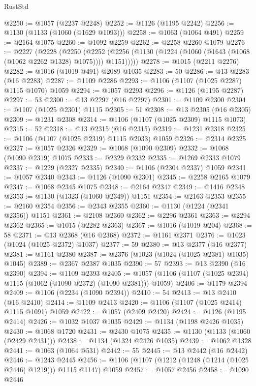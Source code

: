\begin{lexlean}{RustStd}
\begin{coremodule}
@2250 := @1057 (@2237 @2248)
@2252 := @1126 (@1195 @2242)
@2256 := @1130 (@1133 (@1060 (@1629 @1093)))
@2258 := @1063 (@1064 @491)
@2259 := @2164 @1075
@2260 := @1092 @2259
@2262 := @2258 @2260 @1079
@2276 := @2227
    (@2228
      (@2250
        (@2252 (@2256 (@1130 (@1224 (@1060 (@1643 (@1068 (@1062 @2262 @1328) @1075)))) @1151)))))
@2278 := @1015 (@2211 @2276)
@2282 := @1016 (@1019 @491) @2089 @1035
@2283 := 50
@2286 := @13 @2283 (@16 @2283)
@2287 := @1109 @2286
@2293 := @1106 (@1107 (@1025 @2287) @1115 @1070) @1059
@2294 := @1057 @2293
@2296 := @1126 (@1195 @2287)
@2297 := 53
@2300 := @13 @2297 (@16 @2297)
@2301 := @1109 @2300
@2304 := @1107 (@1025 @2301) @1115
@2305 := 51
@2308 := @13 @2305 (@16 @2305)
@2309 := @1231 @2308
@2314 := @1106 (@1107 (@1025 @2309) @1115 @1073)
@2315 := 52
@2318 := @13 @2315 (@16 @2315)
@2319 := @1231 @2318
@2325 := @1106 (@1107 (@1025 @2319) @1115 @2033) @1059
@2326 := @2314 @2325
@2327 := @1057 @2326
@2329 := @1068 (@1090 @2309)
@2332 := @1068 (@1090 @2319) @1075
@2333 := @2329 @2332
@2335 := @1269 @2333 @1079
@2337 := @1229 (@2327 @2335)
@2340 := @1106 (@2304 @2337) @1059
@2341 := @1057 @2340
@2343 := @1126 (@1090 @2301)
@2345 := @2258 @2165 @1079
@2347 := @1068 @2345 @1075
@2348 := @2164 @2347
@2349 := @1416 @2348
@2353 := @1130 (@1323 (@1060 @2349)) @1151
@2354 := @2163 @2353
@2355 := @2160 @2354
@2356 := @2343 @2355
@2360 := @1130 (@1224 (@2341 @2356)) @1151
@2361 := @2108 @2360
@2362 := @2296 @2361
@2363 := @2294 @2362
@2365 := @1015 (@2282 @2363)
@2367 := @1016 (@1019 @204)
@2368 := 58
@2371 := @13 @2368 (@16 @2368)
@2372 := @1161 @2371
@2376 := @1023 (@1024 (@1025 @2372) @1037)
@2377 := 59
@2380 := @13 @2377 (@16 @2377)
@2381 := @1161 @2380
@2387 := @2376 (@1023 (@1024 (@1025 @2381) @1035) @1045)
@2389 := @2367 @2387 @1035
@2390 := 57
@2393 := @13 @2390 (@16 @2390)
@2394 := @1109 @2393
@2405 := @1057 (@1106 (@1107 (@1025 @2394) @1115 (@1062 (@1090 @2372) (@1090 @2381))) @1059)
@2406 := @1179 @2394
@2409 := @1106 (@2234 (@1090 @2394))
@2410 := 54
@2413 := @13 @2410 (@16 @2410)
@2414 := @1109 @2413
@2420 := @1106 (@1107 (@1025 @2414) @1115 @1091) @1059
@2422 := @1057 (@2409 @2420)
@2424 := @1126 (@1195 @2414)
@2426 := @1032 @1037 @1035
@2429 := @1134 (@1198 @2426 @1035)
@2430 := @1068 @1720
@2431 := @2430 @1075
@2435 := @1130 (@1133 (@1060 (@2429 @2431)))
@2438 := @1134 (@1324 @2426 @1035)
@2439 := @1062 @1328
@2441 := @1063 (@1064 @531)
@2442 := 55
@2445 := @13 @2442 (@16 @2442)
@2446 := @1243 @2445
@2456 := @1106 (@1107 (@1212 (@1248 (@1214 (@1025 @2446) @1219))) @1115 @1147) @1059
@2457 := @1057 @2456
@2458 := @1090 @2446

\end{coremodule}
\end{lexlean}
